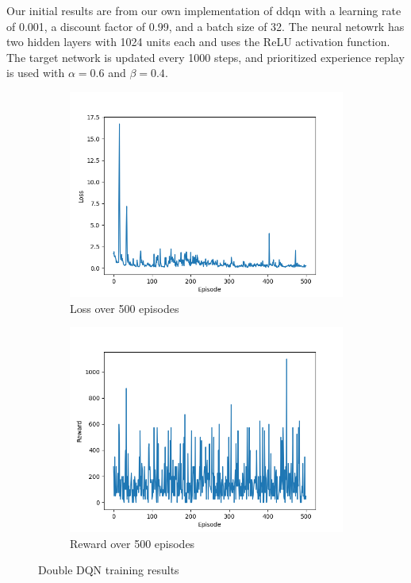 Our initial results are from our own implementation of \gls{ddqn} with
a learning rate of 0.001, a discount factor of 0.99, and a batch size of 32.
The neural netowrk has two hidden layers with 1024 units each and uses the
ReLU activation function. The target network is updated every 1000 steps,
and prioritized experience replay is used with $\alpha = 0.6$ and
$\beta = 0.4$.

\begin{figure}[H]
    \begin{subfigure}{0.45\textwidth}
        \centering
        \includegraphics[width=\textwidth]{img/ddqn-500-loss.png}
        \caption{Loss over 500 episodes}
        \label{fig:ddqn-500-loss}
    \end{subfigure}
    \begin{subfigure}{0.45\textwidth}
        \centering
        \includegraphics[width=\textwidth]{img/ddqn-500-reward.png}
        \caption{Reward over 500 episodes}
        \label{fig:ddqn-500-reward}
    \end{subfigure}
    \caption{Double DQN training results}
    \label{fig:ddqn-500}
\end{figure}

